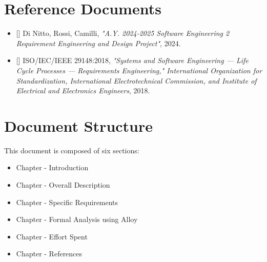 \section{Reference Documents}
\label{sec:reference_documents}
\begin{itemize}
    \item{[\cbib]} Di Nitto, Rossi, Camilli, \textit{"A.Y. 2024-2025 Software Engineering 2 Requirement Engineering and Design Project"}, 2024.
    \item{[\cbib]} ISO/IEC/IEEE 29148:2018, \textit{"Systems and Software Engineering — Life Cycle Processes — Requirements Engineering," International Organization for Standardization, International Electrotechnical Commission, and Institute of Electrical and Electronics Engineers}, 2018.
\end{itemize}

\section{Document Structure}
\label{sec:document_structure}%
This document is composed of six sections:
\begin{itemize}
    \item{}  Chapter - Introduction
    \item{}  Chapter - Overall Description
    \item{}  Chapter - Specific Requirements
    \item{}  Chapter - Formal Analysis using Alloy
    \item{}  Chapter - Effort Spent
    \item{}  Chapter - References
\end{itemize}

